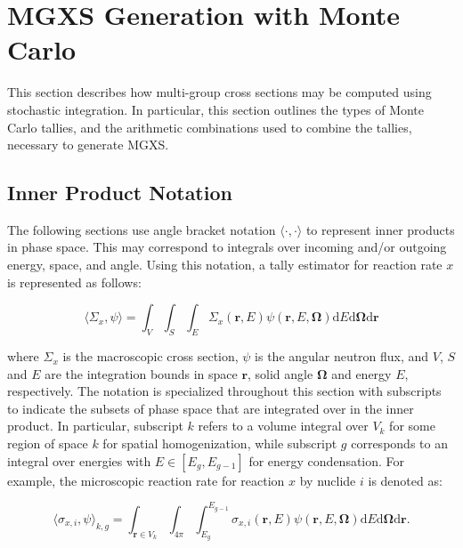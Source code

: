 \section{MGXS Generation with Monte Carlo}
\label{sec:mgxs-mc}

This section describes how multi-group cross sections may be computed using stochastic integration. In particular, this section outlines the types of Monte Carlo tallies, and the arithmetic combinations used to combine the tallies, necessary to generate MGXS.

\subsection{Inner Product Notation}
\label{subsubsec:tally-types-notation}

The following sections use angle bracket notation $\langle \cdot , \cdot \rangle$ to represent inner products in phase space. This may correspond to integrals over incoming and/or outgoing energy, space, and angle. Using this notation, a tally estimator for reaction rate $x$ is represented as follows:

\begin{equation}
\label{eqn:inner-prod}
\langle \Sigma_x, \psi \rangle = \int_{V} \int_{S} \int_{E} \Sigma_{x}(\mathbf{r},E)\psi(\mathbf{r},E,\mathbf{\Omega}) \mathrm{d}E\mathrm{d}\mathbf{\Omega}\mathrm{d}\mathbf{r}
\end{equation}

\noindent where $\Sigma_x$ is the macroscopic cross section, $\psi$ is the angular neutron flux, and $V$, $S$ and $E$ are the integration bounds in space $\mathbf{r}$, solid angle $\mathbf{\Omega}$ and energy $E$, respectively. The notation is specialized throughout this section with subscripts to indicate the subsets of phase space that are integrated over in the inner product. In particular, subscript $k$ refers to a volume integral over $V_{k}$ for some region of space $k$ for spatial homogenization, while subscript $g$ corresponds to an integral over energies with $E \in [E_{g}, E_{g-1}]$ for energy condensation. For example, the microscopic reaction rate for reaction $x$ by nuclide $i$ is denoted as:

\begin{equation}
\label{eqn:angle-rxn-rate}
\langle \sigma_{x,i}, \psi \rangle_{k,g} = \int_{\mathbf{r} \in V_{k}} \int_{4\pi} \int_{E_{g}}^{E_{g-1}} \sigma_{x,i}(\mathbf{r},E)\psi(\mathbf{r},E,\mathbf{\Omega}) \mathrm{d}E\mathrm{d}\mathbf{\Omega}\mathrm{d}\mathbf{r}.
\end{equation}

